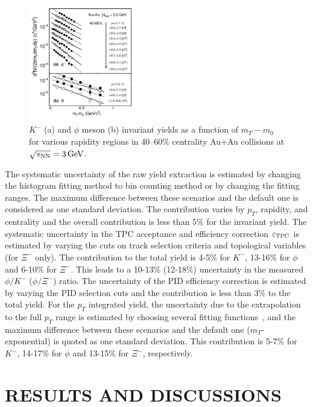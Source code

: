 \documentclass[aps,tightenlines,superscriptaddress,twocolumn]{revtex4-1}
\begin{document}
\begin{figure}
\centering
\includegraphics[width=0.43\textwidth]{fig23-eps-converted-to.pdf}
\caption{$K^-$ (a) and $\phi$ meson (b) invariant yields as a function of $m_T-m_0$ for various rapidity regions in 40--60\% centrality Au+Au collisions at ${\sqrt{s_{\rm NN}} = \rm{3\,GeV}}$.}
\label{fig:phimTSpectra23}
\end{figure}


The systematic uncertainty of the raw yield extraction is estimated by changing the histogram fitting method to bin counting method or by changing the fitting ranges. The maximum difference between these scenarios and the default one is considered as one standard deviation. The contribution varies by $p_T$, rapidity, and centrality and the overall contribution is less than 5\% for the invariant yield. The systematic uncertainty in the TPC acceptance and efficiency correction $\varepsilon_{\rm TPC}$ is estimated by varying the cuts on track selection criteria and topological variables (for $\Xi^-$ only). The contribution to the total yield is 4-5\% for $K^-$, 13-16\% for $\phi$ and 6-10\% for $\Xi^-$. This leads to a 10-13\% (12-18\%) uncertainty in the measured $\phi/K^-$ ($\phi/\Xi^-$) ratio. The uncertainty of the PID efficiency correction is estimated by varying the PID selection cuts and the contribution is less than 3\% to the total yield.
For the $p_T$ integrated yield, the uncertainty due to the extrapolation to the full $p_T$ range is estimated by choosing several fitting functions~\cite{STAR_particleYield}, and the maximum difference between these scenarios and the default one ($m_T$-exponential) is quoted as one standard deviation. This contribution is 5-7\% for $K^-$, 14-17\% for $\phi$ and 13-15\% for $\Xi^-$, respectively.


\section{RESULTS AND DISCUSSIONS}
\label{results}
\end{document}

